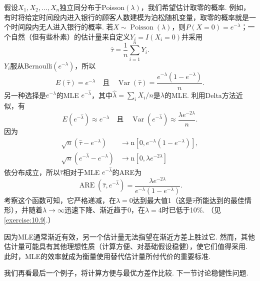 \begin{example}[泊松估计量的ARE]\label{ex:10.1.17}
假设$X_1,X_2,\ldots,X_n$独立同分布于Poisson$(\lambda)$，我们希望估计取零的概率. 例如，有时将给定时间段内进入银行的顾客人数建模为泊松随机变量，取零的概率就是一个时间段内无人进入银行的概率. 若$X\sim\operatorname{Poisson}(\lambda)$，则$P(X=0)=e^{-\lambda}$；一个自然（但有些朴素）的估计量来自定义$Y_i=I(X_i=0)$并采用
$$\hat\tau=\frac1n\sum_{i=1}^nY_i.$$
$Y_i$服从Bernoulli$(e^{-\lambda})$，所以
$$E(\hat\tau)=e^{-\lambda}\quad\text{且}\quad\operatorname{Var}(\hat\tau)=\frac{e^{-\lambda}(1-e^{-\lambda})}n.$$
另一种选择是$e^{-\lambda}$的MLE $e^{-\hat\lambda}$，其中$\hat\lambda=\sum_iX_i/n$是$\lambda$的MLE. 利用Delta方法近似，有
$$E(e^{-\hat\lambda})\approx e^{-\lambda}\quad\text{且}\quad\operatorname{Var}(e^{-\hat\lambda})\approx\frac{\lambda e^{-2\lambda}}n.$$
因为
$$\begin{aligned}
\sqrt n(\hat\tau-e^{-\lambda})&\longrightarrow\mathrm n[0,e^{-\lambda}(1-e^{-\lambda})],\\
\sqrt n(e^{-\hat\lambda}-e^{-\lambda})&\longrightarrow\mathrm n[0,\lambda e^{-2\lambda}]
\end{aligned}$$
依分布成立，所以$\hat\tau$相对于MLE $e^{-\hat\lambda}$的ARE为
$$\operatorname{ARE}(\hat\tau,e^{-\hat\lambda})=\frac{\lambda e^{-2\lambda}}{e^{-\lambda}(1-e^{-\lambda})}.$$
考察这个函数可知，它严格递减，在$\lambda=0$达到最大值1（这是$\hat\tau$所能达到的最佳情形），并随着$\lambda\to\infty$迅速下降、渐近趋于0，在$\lambda=4$时已低于10\%. （见\autoref{exercise:10.9}.）
\end{example}

因为MLE通常渐近有效，另一个估计量无法指望在渐近方差上胜过它. 然而，其他估计量可能具有其他理想性质（计算方便、对基础假设稳健），使它们值得采用. 此时，MLE的效率就成为衡量使用替代估计量所付代价的重要标准.

我们再看最后一个例子，将计算方便与最优方差作比较. 下一节讨论稳健性问题.

